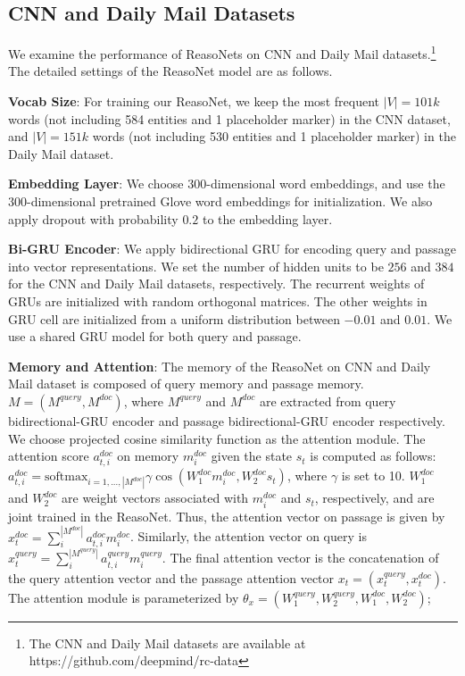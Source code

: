 \documentclass[sigconf]{acmart}
\begin{document}
\subsection{CNN and Daily Mail Datasets}

We examine the performance of ReasoNets on CNN and Daily Mail datasets.\footnote{The CNN and Daily Mail datasets are available at https://github.com/deepmind/rc-data}
The detailed settings of the ReasoNet model are as follows.

\textbf{Vocab Size}: For training our ReasoNet, we keep the most frequent $|{V}| = 101k$ words (not including 584 entities and 1 placeholder marker) in the CNN dataset, and $|{V}| = 151k$ words (not including 530 entities and 1 placeholder marker) in the Daily Mail dataset.

\textbf{Embedding Layer}: We choose $300$-dimensional word embeddings, and use the $300$-dimensional pretrained Glove word embeddings \citep{GloveEMNLP2014} for initialization. We also apply dropout with probability $0.2$ to the embedding layer.

\textbf{Bi-GRU Encoder}: We apply bidirectional GRU for encoding query and passage into vector representations. We set the number of hidden units to be $256$ and $384$ for the CNN and Daily Mail datasets, respectively. The recurrent weights of GRUs are initialized with random orthogonal matrices. The other weights in GRU cell are initialized from a uniform distribution between $-0.01$ and $0.01$. We use a shared GRU model for both query and passage.

\textbf{Memory and Attention}: The memory of the ReasoNet on CNN and Daily Mail dataset is composed of query memory and passage memory. $M = (M^{query}, M^{doc})$, where $M^{query}$ and $M^{doc}$ are extracted from query bidirectional-GRU encoder and passage bidirectional-GRU encoder respectively. We  choose projected cosine similarity function as the attention module. The attention score $a^{doc}_{t,i}$ on memory $m^{doc}_i$ given the state $s_t$ is computed as follows:
	  $ a^{doc}_{t,i} = \text{softmax}_{i=1,...,|M^{doc}|} \gamma \cos({W^{doc}_1} m^{doc}_i, {W^{doc}_2} s_t)$, 
where $\gamma$ is set to 10. ${W^{doc}_1}$ and ${W^{doc}_2}$ are weight vectors associated with $m^{doc}_i$ and $s_t$, respectively, and are joint trained in the ReasoNet. Thus, the attention vector on passage is given by $x^{doc}_t = \sum_{i}^{|M^{doc}|} a^{doc}_{t,i} m^{doc}_i$. Similarly, the attention vector on query is  $x^{query}_t = \sum_{i}^{|M^{query}|} a^{query}_{t,i} m^{query}_i$.
The final attention vector is the concatenation of the query attention vector and the passage attention vector $x_t = (x^{query}_t, x^{doc}_t)$. The attention module is parameterized by $\theta_x = ({W^{query}_1}, {W^{query}_2}, {W^{doc}_1}, {W^{doc}_2})$;
\end{document}

